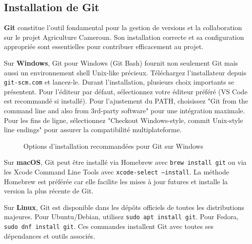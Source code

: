 \subsection{Installation de Git}

\textbf{Git} constitue l'outil fondamental pour la gestion de versions et la collaboration sur le projet Agriculture Cameroun. Son installation correcte et sa configuration appropriée sont essentielles pour contribuer efficacement au projet.

Sur \textbf{Windows}, Git pour Windows (Git Bash) fournit non seulement Git mais aussi un environnement shell Unix-like précieux. Téléchargez l'installateur depuis \texttt{git-scm.com} et lancez-le. Durant l'installation, plusieurs choix importants se présentent. Pour l'éditeur par défaut, sélectionnez votre éditeur préféré (VS Code est recommandé si installé). Pour l'ajustement du PATH, choisissez "Git from the command line and also from 3rd-party software" pour une intégration maximale. Pour les fins de ligne, sélectionnez "Checkout Windows-style, commit Unix-style line endings" pour assurer la compatibilité multiplateforme.

\begin{figure}[h]
\centering
{}
\caption{Options d'installation recommandées pour Git sur Windows}
\end{figure}

Sur \textbf{macOS}, Git peut être installé via Homebrew avec \texttt{brew install git} ou via les Xcode Command Line Tools avec \texttt{xcode-select --install}. La méthode Homebrew est préférée car elle facilite les mises à jour futures et installe la version la plus récente de Git.

Sur \textbf{Linux}, Git est disponible dans les dépôts officiels de toutes les distributions majeures. Pour Ubuntu/Debian, utilisez \texttt{sudo apt install git}. Pour Fedora, \texttt{sudo dnf install git}. Ces commandes installent Git avec toutes ses dépendances et outils associés.

